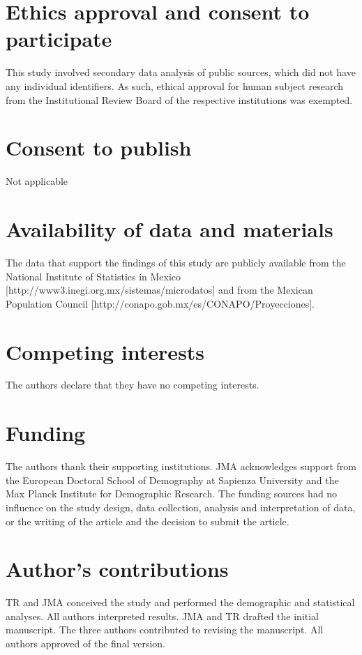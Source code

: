 \documentclass{bmcart}
\begin{document}
\begin{backmatter}

\section*{Ethics approval and consent to participate}
This study involved secondary data analysis of public sources, which did not have any individual identifiers. As such, ethical approval for human
subject research from the Institutional Review Board of the respective institutions was exempted.

\section*{Consent to publish}
Not applicable

\section*{Availability of data and materials}
The data that support the findings of this study are publicly available from the National Institute of Statistics in Mexico [http://www3.inegi.org.mx/sistemas/microdatos] and from the Mexican Population Council [http://conapo.gob.mx/es/CONAPO/Proyecciones].

\section*{Competing interests}
The authors declare that they have no competing interests.

\section*{Funding}
The authors thank their supporting institutions. JMA acknowledges support from the European Doctoral School of Demography at Sapienza University and the Max Planck Institute for Demographic Research. The funding sources
had no influence on the study design, data collection, analysis and interpretation of
data, or the writing of the article and the decision to submit the article.

\section*{Author's contributions}
TR and JMA conceived the study and performed the demographic and statistical analyses. All authors interpreted results. JMA and TR drafted the initial manuscript. The three authors contributed to revising the manuscript. All authors approved of the final version.
 

\end{backmatter}
\end{document}
